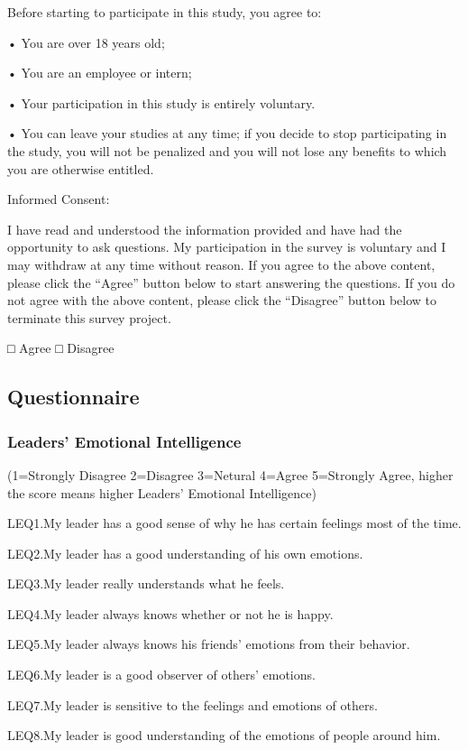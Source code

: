 \documentclass[
  man,
  longtable,
  nolmodern,
  notxfonts,
  notimes,
  colorlinks=true,linkcolor=blue,citecolor=blue,urlcolor=blue]{apa7}
\begin{document}
Before starting to participate in this study, you agree to:

• You are over 18 years old;

• You are an employee or intern;

• Your participation in this study is entirely voluntary.

• You can leave your studies at any time; if you decide to stop
participating in the study, you will not be penalized and you will not
lose any benefits to which you are otherwise entitled.

Informed Consent:

I have read and understood the information provided and have had the
opportunity to ask questions. My participation in the survey is
voluntary and I may withdraw at any time without reason. If you agree to
the above content, please click the ``Agree'' button below to start
answering the questions. If you do not agree with the above content,
please click the ``Disagree'' button below to terminate this survey
project.

□ Agree □ Disagree

\subsection{Questionnaire}\label{questionnaire}

\subsubsection{Leaders' Emotional
Intelligence}\label{leaders-emotional-intelligence-1}

(1=Strongly Disagree 2=Disagree 3=Netural 4=Agree 5=Strongly Agree,
higher the score means higher Leaders' Emotional Intelligence)

LEQ1.My leader has a good sense of why he has certain feelings most of
the time.

LEQ2.My leader has a good understanding of his own emotions.

LEQ3.My leader really understands what he feels.

LEQ4.My leader always knows whether or not he is happy.

LEQ5.My leader always knows his friends' emotions from their behavior.

LEQ6.My leader is a good observer of others' emotions.

LEQ7.My leader is sensitive to the feelings and emotions of others.

LEQ8.My leader is good understanding of the emotions of people around
him.
\end{document}
